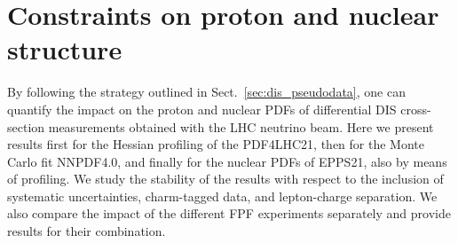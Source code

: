 \section{Constraints on proton and nuclear structure}
\label{sec:protonPDFs}

By following the strategy outlined in Sect.~\ref{sec:dis_pseudodata}, one can
quantify the impact on the proton and nuclear PDFs of differential  DIS
cross-section measurements obtained with the  LHC neutrino beam. 
%
Here we present results first for the Hessian profiling of the PDF4LHC21,
then for the Monte Carlo fit NNPDF4.0, and finally for the nuclear PDFs of EPPS21, also
by means of profiling.
%
We study the stability of the results with respect to the inclusion of systematic uncertainties,
charm-tagged data, and lepton-charge separation.
%
We also compare the impact of the different FPF experiments separately and provide
results for their combination.

